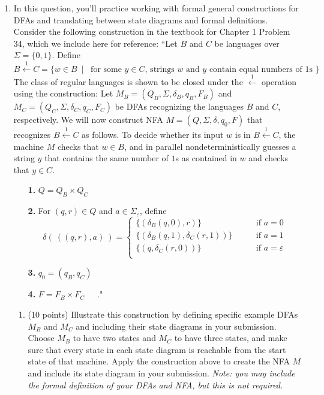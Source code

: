 \begin{enumerate}
\item In this question, you'll practice working with formal general constructions
for DFAs and translating between state diagrams and formal definitions.
Consider the following
construction in the 
textbook for Chapter 1 Problem 34, which we include here for reference: 
``Let $B$ and $C$ be languages over $\Sigma = \{ 0,1\}$. Define
\[
B \overset{1}{\leftarrow} C= \{ w \in B ~\mid~\textrm{ for some $y \in C$, strings $w$ and $y$ contain equal 
numbers of $1$s }\}
\]
The class of regular languages is shown to be closed under the $\overset{1}{\leftarrow}$ operation
using the construction: Let $M_B = (Q_B, \Sigma, \delta_B, q_B, F_B)$ and $M_C = ( Q_C, \Sigma, \delta_C, q_C, F_C)$ be DFAs recognizing the languages $B$ and $C$, respectively.  We will now construct NFA
$M = (Q, \Sigma, \delta, q_0, F)$ that recognizes $B \overset{1}{\leftarrow} C$ as follows.  To decide
whether its input $w$ is in $B \overset{1}{\leftarrow} C$, the machine $M$ checks that $w \in B$, and 
in parallel nondeterministically guesses a string $y$ that contains the same number of $1$s as 
contained in $w$ and checks that $y \in C$.
\begin{itemize}
\item[{\bf 1.}] $Q = Q_B \times Q_C$
\item[{\bf 2.}] For $(q,r) \in Q$ and $a \in \Sigma_\varepsilon$, define
\[
\delta( ~((q,r), a)~) = \begin{cases}
\{ (\delta_B(q,0) , r ) \}  \qquad&\textrm{if } a = 0 \\
\{ (\delta_B( q,1) ,  \delta_C( r,1) ) \}  \qquad&\textrm{if } a = 1 \\
\{ (q, \delta_C( r,0 ))\}  \qquad&\textrm{if } a = \varepsilon\\
\end{cases}
\]
\item[{\bf 3.}] $q_0 = (q_B, q_C)$
\item[{\bf 4.}] $F = F_B \times F_C$~~~."
\end{itemize}

\begin{enumerate}
\item (10 points) Illustrate this construction by defining specific example DFAs $M_B$ and $M_C$ and including 
their state diagrams in your submission.   Choose $M_B$ to have two states and $M_C$
to have three states, and make sure that every state in each state diagram is reachable from the start state
of that machine.
Apply the construction above to create the NFA $M$  and include its state diagram in your submission.
{\it Note: you may 
 include the formal definition of your DFAs and NFA, but this is not required.} 


\end{enumerate}
\end{enumerate}
